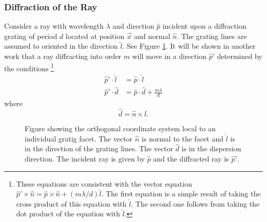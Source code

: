 \documentclass{article}
\newcommand{\p}{\hat{p}}
\newcommand{\x}{\vec{x}}
\begin{document}

\subsubsection{Diffraction of the Ray} %
 Consider a ray with wavelength $\lambda$ and direction $\p$ incident upon a
 diffraction grating of period $d$ located at position $\x$ and normal
 $\hat{n}$.  The grating lines are assumed to oriented in the direction
 $\hat{l}$.  See Figure \ref{fig:grating}.  It will be shown in another work
 that a ray diffracting into order $m$ will move in a direction $\p'$
 determined by the conditions%
\footnote{These equations are consistent with the vector equation
  $\p'\times\hat{n}=\p\times\hat{n} + (m\lambda/d)\hat{l}$.  The first
  equation is a simple result of taking the cross product of this equation
  with $\hat{l}$.  The second one follows from taking the dot product of
  the equation with $\hat{l}$.}
\begin{align}
    \label{diffract0}
    \p'\cdot\hat{l} &= \p\cdot\hat{l} \\
    \p'\cdot\hat{d} &= \p\cdot\hat{d} + \frac{m\lambda}{d}
\end{align}
 where 
\begin{equation} 
    \hat{d} = \hat{n} \times \hat{l}.
\end{equation}

\begin{figure}
\begin{center}
\caption{Figure showing the orthogonal coordinate system local to an
individual gratig facet.  The vector $\hat{n}$ is normal to the facet and
$\hat{l}$ is in the direction of the grating lines.  The vector $\hat{d}$ is
in the dispersion direction.  The incident ray is given by $\p$ and
the diffracted ray is $\p'$.}
 \label{fig:grating}
\end{center}
\end{figure}
\end{document}
